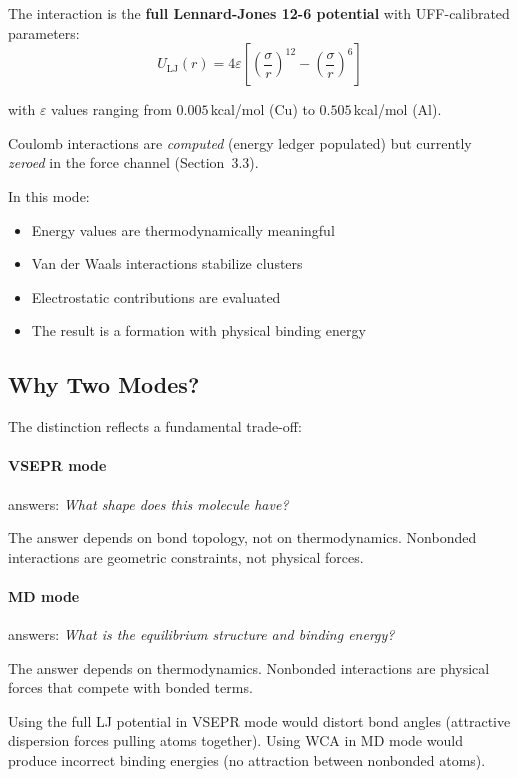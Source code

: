\documentclass[11pt]{article}
\begin{document}
The interaction is the \textbf{full Lennard-Jones 12-6 potential} with UFF-calibrated parameters:
\begin{equation}
U_{\text{LJ}}(r) = 4\varepsilon\left[\left(\frac{\sigma}{r}\right)^{12} - \left(\frac{\sigma}{r}\right)^6\right]
\end{equation}

with $\varepsilon$ values ranging from $0.005$\,kcal/mol (Cu) to $0.505$\,kcal/mol (Al).

Coulomb interactions are \textit{computed} (energy ledger populated) but currently \textit{zeroed} in the force channel (Section~3.3).

In this mode:
\begin{itemize}
\item Energy values are thermodynamically meaningful
\item Van der Waals interactions stabilize clusters
\item Electrostatic contributions are evaluated
\item The result is a formation with physical binding energy
\end{itemize}

\subsection{Why Two Modes?}

The distinction reflects a fundamental trade-off:

\paragraph{VSEPR mode} answers: \textit{What shape does this molecule have?}

The answer depends on bond topology, not on thermodynamics. Nonbonded interactions are geometric constraints, not physical forces.

\paragraph{MD mode} answers: \textit{What is the equilibrium structure and binding energy?}

The answer depends on thermodynamics. Nonbonded interactions are physical forces that compete with bonded terms.

Using the full LJ potential in VSEPR mode would distort bond angles (attractive dispersion forces pulling atoms together). Using WCA in MD mode would produce incorrect binding energies (no attraction between nonbonded atoms).
\end{document}
